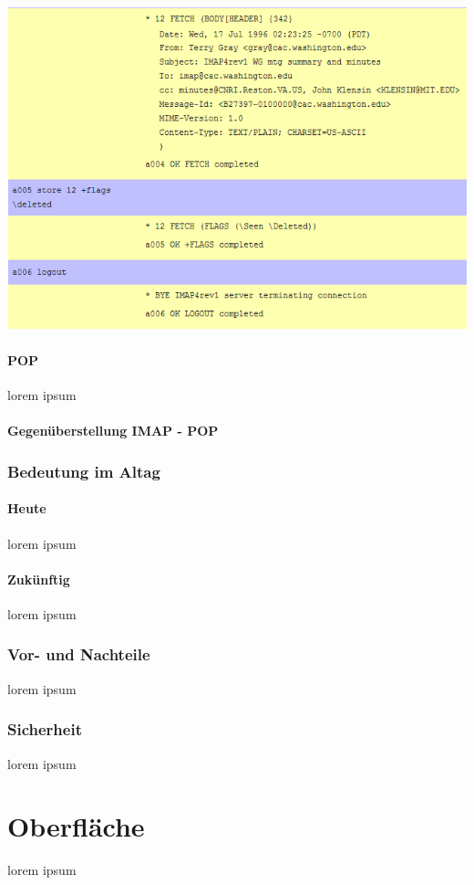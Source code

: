 \documentclass[12pt,a4paper]{report}
\begin{document}
\begin{onehalfspace}
\begin{center}
\includegraphics[scale=0.7]{../docs/lyaton/graphics/IMAP-Kommunikation_p2.png}
\end{center}

\subsubsection{POP}
lorem ipsum
\subsubsection{Gegenüberstellung IMAP - POP} \label{sssec:IMAPvsPOP}
\subsection{Bedeutung im Altag}
\subsubsection{Heute}
lorem ipsum
\subsubsection{Zukünftig}
lorem ipsum
\subsection{Vor- und Nachteile}
lorem ipsum
\subsection{Sicherheit}
\label{sssec:Spam}
lorem ipsum
\chapter{Oberfläche}
lorem ipsum

\end{onehalfspace}
\end{document}

